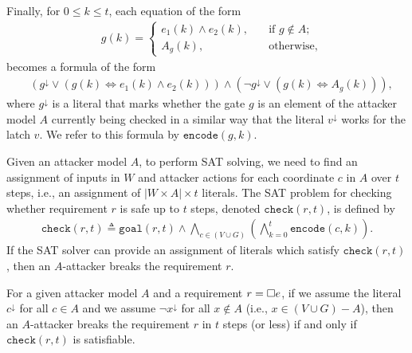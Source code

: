 Finally, for $0\leq k \leq t$, each equation of the form
\begin{align*}
&g(k) = \begin{cases}
e_1(k)\land e_2(k), \quad &\text{if $g\not \in A$;}\\
A_g(k), \quad &\text{otherwise},
\end{cases}
\end{align*}
becomes a formula of the form
\begin{align}
&\left(g^{\downarrow} \lor (g(k) \Leftrightarrow e_1(k)\land e_2(k) ) \right)\land \left(\lnot g^{\downarrow} \lor (g(k) \Leftrightarrow A_g(k)) \right),
\end{align}
where $g^{\downarrow}$ is a literal that marks whether the gate $g$ is an element of the attacker model $A$ currently being checked in a similar way that the literal $v^\downarrow$ works for the latch $v$. We refer to this formula by $\mathtt{encode}(g,k)$.


Given an attacker model $A$, to perform SAT solving, we need to find an assignment of inputs in $W$ and attacker actions for each coordinate $c$ in $A$ over $t$ steps, i.e., an assignment of ${|W\times A|\times t}$ literals. The SAT problem for checking whether requirement $r$ is safe up to $t$ steps, denoted $\mathtt{check}(r,t)$, is defined by 
\begin{align}
\label{eq:naiveCheck}
\mathtt{check}(r,t)\triangleq\mathtt{goal}(r,t)\land\! \bigwedge_{c\in (V \cup G)}\left( \bigwedge_{k=0}^{t}{\mathtt{encode}(c,k)}\right).
\end{align}
If the SAT solver can provide an assignment of literals which satisfy $\mathtt{check}(r,t)$, then an $A$-attacker breaks the requirement $r$.
\begin{proposition}
\label{prop:Correctness}
For a given attacker model $A$ and a requirement $r={{\square}} e$, if we assume the literal $c^{\downarrow}$ for all $c \in A$ and we assume $\lnot x^{\downarrow}$ for all $x\not\in A$ (i.e., $x\in (V \cup G)-A$), then an $A$-attacker breaks the requirement $r$ in $t$ steps (or less) if and only if $\mathtt{check}(r,t)$ is satisfiable.
\end{proposition}

